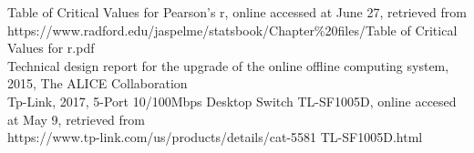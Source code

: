 Table of Critical Values for Pearson's r, online accessed at June 27, retrieved from \\https://www.radford.edu/jaspelme/statsbook/Chapter\%20files/Table of Critical Values for r.pdf\\

Technical design report for the upgrade of the online offline computing system, 2015, The ALICE Collaboration\\

Tp-Link, 2017, 5-Port 10/100Mbps Desktop Switch TL-SF1005D, online accesed at May 9, retrieved from \\https://www.tp-link.com/us/products/details/cat-5581 TL-SF1005D.html\\